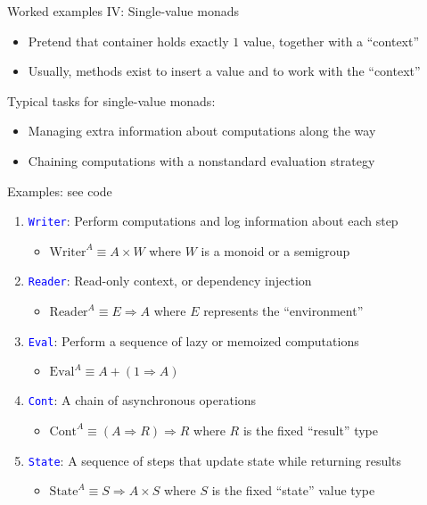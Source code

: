 \documentclass[english]{beamer}
\begin{document}
\begin{frame}{Worked examples IV: Single-value monads}

\begin{itemize}
\item Pretend that container holds exactly $1$ value, together with a ``context''
\item Usually, methods exist to insert a value and to work with the ``context''
\end{itemize}
Typical tasks for single-value monads:
\begin{itemize}
\item Managing extra information about computations along the way
\item Chaining computations with a nonstandard evaluation strategy
\end{itemize}
Examples: see code
\begin{enumerate}
\item \texttt{\textcolor{blue}{\footnotesize{}Writer}}: Perform computations
and log information about each step
\begin{itemize}
\item $\text{Writer}^{A}\equiv A\times W$ where $W$ is a monoid or a semigroup
\end{itemize}
\item \texttt{\textcolor{blue}{\footnotesize{}Reader}}: Read-only context,
or dependency injection
\begin{itemize}
\item $\text{Reader}^{A}\equiv E\Rightarrow A$ where $E$ represents the
``environment''
\end{itemize}
\item \texttt{\textcolor{blue}{\footnotesize{}Eval}}: Perform a sequence
of lazy or memoized computations
\begin{itemize}
\item $\text{Eval}^{A}\equiv A+\left(1\Rightarrow A\right)$
\end{itemize}
\item \texttt{\textcolor{blue}{\footnotesize{}Cont}}: A chain of asynchronous
operations
\begin{itemize}
\item $\text{Cont}^{A}\equiv\left(A\Rightarrow R\right)\Rightarrow R$ where
$R$ is the fixed ``result'' type
\end{itemize}
\item \texttt{\textcolor{blue}{\footnotesize{}State}}: A sequence of steps
that update state while returning results
\begin{itemize}
\item $\text{State}^{A}\equiv S\Rightarrow A\times S$ where $S$ is the
fixed ``state'' value type
\end{itemize}
\end{enumerate}
\end{frame}
\end{document}
